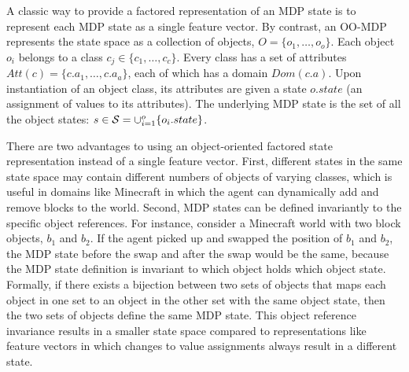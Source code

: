 \documentclass[]{article}
\newcommand{\stnote}[1]{\textcolor{Blue}{\textbf{ST: #1}}}
\newcommand{\dnote}[1]{\textcolor{Orange}{\textbf{D: #1}}}
\begin{document}
A classic way to provide a factored representation of an MDP state is to represent
each MDP state as a single feature vector. By contrast, an OO-MDP represents the state space as a collection of objects,
$O = \{o_1, \ldots, o_o \}$.  Each object $o_i$ belongs to a
class $c_j \in  \{c_1, \ldots, c_c\}$. Every class has a set of attributes
$Att(c) = \{c.a_1, \ldots, c.a_a \}$, each of which has a domain $Dom(c.a)$.
Upon instantiation of an object class, its attributes are given a state $o.state$
(an assignment of values to its attributes).  The underlying MDP state is the set
of all the object states: $s \in {\cal S} = \cup_{i = 1}^o \{o_i.state\}$.

There are two advantages to using an object-oriented factored state
representation instead of a single feature vector. First, different
states in the same state space may contain different numbers of
objects of varying classes, which is useful in domains like Minecraft
in which the agent can dynamically add and remove blocks to the
world. Second, MDP states can be defined invariantly to the specific
object references.  For instance, consider a Minecraft world with two
block objects, $b_1$ and $b_2$.  If the agent picked up and swapped
the position of $b_1$ and $b_2$, the MDP state before the swap and
after the swap would be the same, because the MDP state definition is
invariant to which object holds which object state.  Formally, if
there exists a bijection between two sets of objects that maps each
object in one set to an object in the other set with the same object
state, then the two sets of objects define the same MDP state.  This
object reference invariance results in a smaller state space compared
to representations like feature vectors in which changes to value
assignments always result in a different state.

\end{document}
